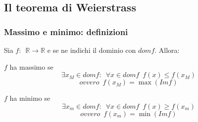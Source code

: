 \documentclass[10pt, oneside]{book}
\theoremstyle{plain}
\begin{document}
\subsection{Il teorema di Weierstrass}

\subsubsection{Massimo e minimo: definizioni}
Sia $f : \enspace \mathbb{R} \longrightarrow \mathbb{R}$ e se ne indichi il dominio con $dom f$. Allora:
\begin{defin}
$f$ ha massimo se \[\exists x_M \in dom f : \enspace \forall x \in dom f \enspace f(x) \leq f(x_M)\]
\[ovvero \enspace f(x_M) = \max (Im f)\]
\end{defin}
\begin{defin}
$f$ ha minimo se \[\exists x_m \in dom f : \enspace \forall x \in dom f \enspace f(x) \geq f(x_m)\]
\[ovvero \enspace f(x_m) = \min (Im f)\]
\end{defin}
\end{document}
